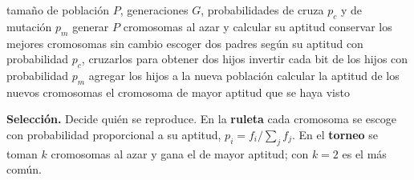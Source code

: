 \documentclass[11pt,letterpaper]{article}
\begin{document}
\begin{algorithm}[H]
\caption{Algoritmo genético para selección de atributos}
\begin{algorithmic}[1]
\Require tamaño de población $P$, generaciones $G$, probabilidades de
         cruza $p_c$ y de mutación $p_m$
\State generar $P$ cromosomas al azar y calcular su aptitud
  \State conservar los mejores cromosomas sin cambio
    \State escoger dos padres según su aptitud
    \State con probabilidad $p_c$, cruzarlos para obtener dos hijos
    \State invertir cada bit de los hijos con probabilidad $p_m$
    \State agregar los hijos a la nueva población
  \EndWhile
  \State calcular la aptitud de los nuevos cromosomas
\EndFor
\State \Return el cromosoma de mayor aptitud que se haya visto
\end{algorithmic}
\end{algorithm}

\textbf{Selección.} Decide quién se reproduce. En la \textbf{ruleta}
cada cromosoma se escoge con probabilidad proporcional a su aptitud,
$p_i = f_i / \sum_j f_j$. En el \textbf{torneo} se toman $k$ cromosomas
al azar y gana el de mayor aptitud; con $k = 2$ es el más común.
\end{document}
